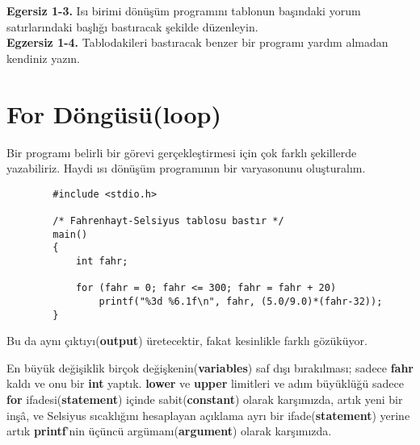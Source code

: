 \documentclass[a4paper,12pt,oneside]{book}
\begin{document}
\textbf{Egersiz 1-3.} Isı birimi dönüşüm programını tablonun başındaki yorum satırlarındaki başlığı bastıracak şekilde düzenleyin. \\


\textbf{Egzersiz 1-4.} Tablodakileri bastıracak benzer bir programı yardım almadan kendiniz yazın.

\section{For Döngüsü(\textbf{loop})}

\par Bir programı belirli bir görevi gerçekleştirmesi için çok farklı şekillerde yazabiliriz. Haydi ısı dönüşüm programının bir varyasonunu oluşturalım.

\begin{lstlisting}
        #include <stdio.h>

        /* Fahrenhayt-Selsiyus tablosu bastır */
        main()
        {
            int fahr;

            for (fahr = 0; fahr <= 300; fahr = fahr + 20)
                printf("%3d %6.1f\n", fahr, (5.0/9.0)*(fahr-32));
        }
\end{lstlisting}

Bu da aynı çıktıyı(\textbf{output}) üretecektir, fakat kesinlikle farklı gözüküyor.

\pagebreak En büyük değişiklik birçok değişkenin(\textbf{variables}) saf dışı bırakılması; sadece \textbf{fahr} kaldı ve onu bir \textbf{int} yaptık. \textbf{lower} ve \textbf{upper} limitleri ve adım büyüklüğü sadece \textbf{for} ifadesi(\textbf{statement}) içinde sabit(\textbf{constant}) olarak karşımızda, artık yeni bir inşâ, ve Selsiyus sıcaklığını hesaplayan açıklama ayrı bir ifade(\textbf{statement}) yerine artık \textbf{printf}'nin üçüncü argümanı(\textbf{argument}) olarak karşımızda.
\end{document}
